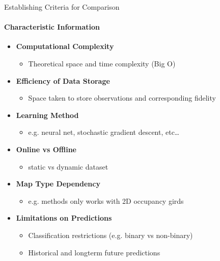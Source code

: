 \documentclass{beamer}
\begin{document}
\begin{frame}[t]{Establishing Criteria for Comparison}
  \framesubtitle{Characteristic Information}
  \begin{itemize}
    \item \textbf{Computational Complexity}
      \begin{itemize}
        \item Theoretical space and time complexity (Big O)
      \end{itemize}

    \item \textbf{Efficiency of Data Storage}
      \begin{itemize}
        \item Space taken to store observations and corresponding fidelity
      \end{itemize}

    \item \textbf{Learning Method}
      \begin{itemize}
        \item e.g. neural net, stochastic gradient descent, etc\dots
      \end{itemize}

    \item \textbf{Online vs Offline}
      \begin{itemize}
        \item static vs dynamic dataset
      \end{itemize}

    \item \textbf{Map Type Dependency}
      \begin{itemize}
        \item e.g. methods only works with 2D occupancy girds
      \end{itemize}

    \item \textbf{Limitations on Predictions}
      \begin{itemize}
        \item Classification restrictions (e.g. binary vs non-binary)
        \item Historical and longterm future predictions
      \end{itemize}

  \end{itemize}
\end{frame}
\end{document}
